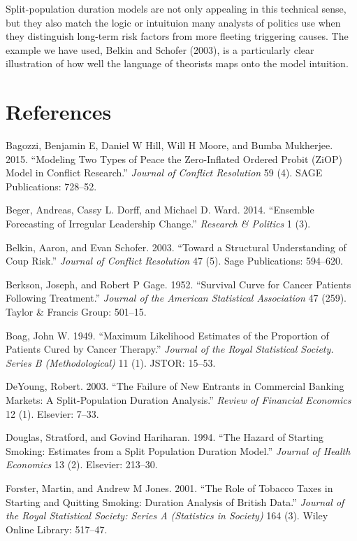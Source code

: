 \documentclass[article]{jss}
\begin{document}
Split-population duration models are not only appealing in this
technical sense, but they also match the logic or intuituion many
analysts of politics use when they distinguish long-term risk factors
from more fleeting triggering causes. The example we have used, Belkin
and Schofer (2003), is a particularly clear illustration of how well the
language of theorists maps onto the model intuition.

\section*{References}\label{references}

Bagozzi, Benjamin E, Daniel W Hill, Will H Moore, and Bumba Mukherjee.
2015. ``Modeling Two Types of Peace the Zero-Inflated Ordered Probit
(ZiOP) Model in Conflict Research.'' \emph{Journal of Conflict
Resolution} 59 (4). SAGE Publications: 728--52.

Beger, Andreas, Cassy L. Dorff, and Michael D. Ward. 2014. ``Ensemble
Forecasting of Irregular Leadership Change.'' \emph{Research \&
Politics} 1 (3).

Belkin, Aaron, and Evan Schofer. 2003. ``Toward a Structural
Understanding of Coup Risk.'' \emph{Journal of Conflict Resolution} 47
(5). Sage Publications: 594--620.

Berkson, Joseph, and Robert P Gage. 1952. ``Survival Curve for Cancer
Patients Following Treatment.'' \emph{Journal of the American
Statistical Association} 47 (259). Taylor \& Francis Group: 501--15.

Boag, John W. 1949. ``Maximum Likelihood Estimates of the Proportion of
Patients Cured by Cancer Therapy.'' \emph{Journal of the Royal
Statistical Society. Series B (Methodological)} 11 (1). JSTOR: 15--53.

DeYoung, Robert. 2003. ``The Failure of New Entrants in Commercial
Banking Markets: A Split-Population Duration Analysis.'' \emph{Review of
Financial Economics} 12 (1). Elsevier: 7--33.

Douglas, Stratford, and Govind Hariharan. 1994. ``The Hazard of Starting
Smoking: Estimates from a Split Population Duration Model.''
\emph{Journal of Health Economics} 13 (2). Elsevier: 213--30.

Forster, Martin, and Andrew M Jones. 2001. ``The Role of Tobacco Taxes
in Starting and Quitting Smoking: Duration Analysis of British Data.''
\emph{Journal of the Royal Statistical Society: Series A (Statistics in
Society)} 164 (3). Wiley Online Library: 517--47.
\end{document}
